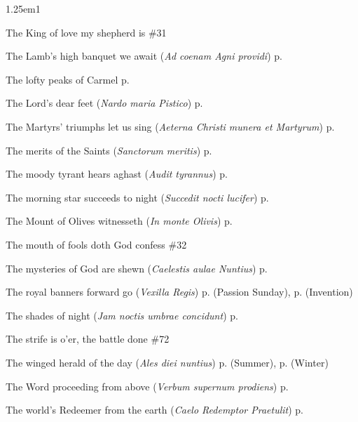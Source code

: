 \begin{hangparas}{1.25em}{1}
\par\noindent
The King of love my shepherd is \dotfill \#31
\par\noindent
The Lamb's high banquet we await (\textit{Ad coenam Agni providi}) \dotfill p. \pageref{EasterEvensong}
\par\noindent
The lofty peaks of Carmel \dotfill p. \pageref{EliasIEvensong}
\par\noindent
The Lord's dear feet (\textit{Nardo maria Pistico}) \dotfill p. \pageref{MaryMagdaleneInvitatory}
\par\noindent
The Martyrs' triumphs let us sing (\textit{Aeterna Christi munera et Martyrum}) \dotfill p. \pageref{MartyrsInvitatory}
\par\noindent
The merits of the Saints (\textit{Sanctorum meritis}) \dotfill p. \pageref{MartyrsEvensong}
\par\noindent
The moody tyrant hears aghast (\textit{Audit tyrannus}) \dotfill p. \pageref{HolyInnocentsInvitatoryHymn}
\par\noindent
The morning star succeeds to night (\textit{Succedit nocti lucifer}) \dotfill p. \pageref{AnneMattins}
\par\noindent
The Mount of Olives witnesseth (\textit{In monte Olivis}) \dotfill p. \pageref{HolyRosaryInvitatory}
\par\noindent
The mouth of fools doth God confess \dotfill \#32
\par\noindent
The mysteries of God are shewn (\textit{Caelestis aulae Nuntius}) \dotfill p. \pageref{HolyRosaryIEvensong}
\par\noindent
The royal banners forward go (\textit{Vexilla Regis}) \dotfill p. \pageref{PassionSundayEvensong} (Passion Sunday), p. \pageref{InventionEvensong} (Invention)
\par\noindent
The shades of night (\textit{Jam noctis umbrae concidunt}) \dotfill p. \pageref{ScholasticaMattins}
\par\noindent
The strife is o'er, the battle done \dotfill \#72
\par\noindent
The winged herald of the day (\textit{Ales diei nuntius}) \dotfill p. \pageref{TuesdayMattinsSummer} (Summer), p. \pageref{TuesdayMattinsWinter} (Winter)
\par\noindent
The Word proceeding from above (\textit{Verbum supernum prodiens}) \dotfill p. \pageref{CorpusChristiMattins}
\par\noindent
The world's Redeemer from the earth (\textit{Caelo Redemptor Praetulit}) \dotfill p. \pageref{MotherhoodInvitatory}
\par\noindent

\end{hangparas}
